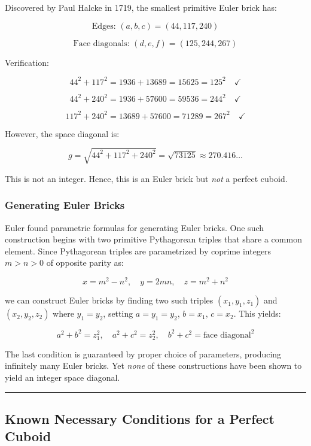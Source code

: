 \documentclass[10pt,a4paper]{article}
\begin{document}
Discovered by Paul Halcke in 1719, the smallest primitive Euler brick has:

\[\text{Edges: } (a, b, c) = (44, 117, 240)\]




\[\text{Face diagonals: } (d, e, f) = (125, 244, 267)\]

Verification:


\[44^2 + 117^2 = 1936 + 13689 = 15625 = 125^2 \quad \checkmark\]




\[44^2 + 240^2 = 1936 + 57600 = 59536 = 244^2 \quad \checkmark\]




\[117^2 + 240^2 = 13689 + 57600 = 71289 = 267^2 \quad \checkmark\]

However, the space diagonal is:


\[g = \sqrt{44^2 + 117^2 + 240^2} = \sqrt{73125} \approx 270.416\ldots\]

This is not an integer. Hence, this is an Euler brick but \emph{not} a perfect cuboid.

\subsubsection{Generating Euler Bricks}

Euler found parametric formulas for generating Euler bricks. One such construction begins with two primitive Pythagorean triples that share a common element. Since Pythagorean triples are parametrized by coprime integers $m > n > 0$ of opposite parity as:

\[x = m^2 - n^2, \quad y = 2mn, \quad z = m^2 + n^2\]

we can construct Euler bricks by finding two such triples $(x_1, y_1, z_1)$ and $(x_2, y_2, z_2)$ where $y_1 = y_2$, setting $a = y_1 = y_2$, $b = x_1$, $c = x_2$. This yields:

\[a^2 + b^2 = z_1^2, \quad a^2 + c^2 = z_2^2, \quad b^2 + c^2 = \text{face diagonal}^2\]

The last condition is guaranteed by proper choice of parameters, producing infinitely many Euler bricks. Yet \emph{none} of these constructions have been shown to yield an integer space diagonal.

\begin{center}
\rule{0.5\textwidth}{0.4pt}
\end{center}

\subsection{Known Necessary Conditions for a Perfect Cuboid}
\end{document}
